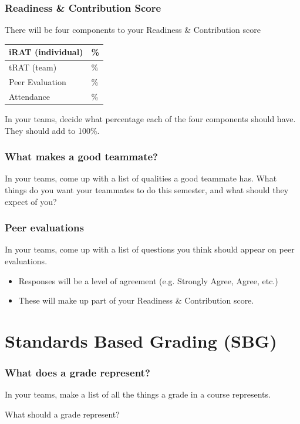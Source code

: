 \documentclass[aspectration=1610]{beamer}
\begin{document}
  \begin{frame} \frametitle{Readiness \& Contribution Score}
  There will be four components to your Readiness \& Contribution score

  \begin{center}
  \begin{tabular}{l|l}
  \hline
  iRAT (individual) & \phantom{xxxx}\%   \\ \hline
  tRAT (team) & \phantom{xxxx}\%   \\ \hline
  Peer Evaluation & \phantom{xxxx}\%   \\ \hline
  Attendance & \phantom{xxxx}\%   \\ \hline
  \end{tabular}
  \end{center}


  In your teams, decide what percentage each of the four components should have.  They should add to 100\%.
  \end{frame}
  
\begin{frame}\frametitle{What makes a good teammate?}

In your teams, come up with a list of qualities a good teammate has.
\vfill
What things do you want your teammates to do this semester, and what should they expect of you?
\vfill
\end{frame}

\begin{frame}\frametitle{Peer evaluations}

In your teams, come up with a list of questions you think should appear on peer evaluations.
\begin{itemize}
\item Responses will be a level of agreement (e.g. Strongly Agree, Agree, etc.)
\item These will make up part of your Readiness \& Contribution score.
\end{itemize}
\end{frame}

\section{Standards Based Grading (SBG)}
\begin{frame}\frametitle{What does a grade represent?}

In your teams, make a list of all the things a grade in a course represents.
\vfill

\pause
What should a grade represent?
\vfill
\end{frame}
\end{document}
